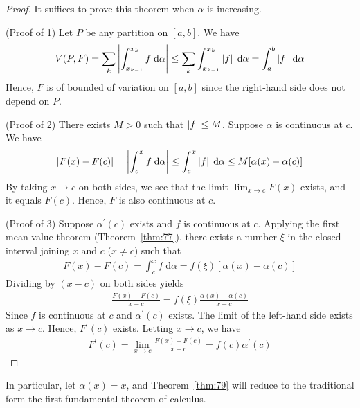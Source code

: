 \documentclass[thmcnt=section, 12pt]{my-elegantbook}
\begin{document}
\begin{proof}
	It suffices to prove this theorem when $\alpha$ is increasing.

	(Proof of 1) Let $P$ be any partition on $[a, b]$.
	We have 
	\begin{align*}
		V(P,F) = \sum_{k} \left\lvert 
			\int_{x_{k-1}}^{x_k} f \; \mathrm{d} \alpha
		 \right\rvert
		\leq \sum_{k}
		\int_{x_{k-1}}^{x_k} \left\lvert f \right\rvert \; \mathrm{d} \alpha
		= \int_{a}^{b} \left\lvert f \right\rvert \; \mathrm{d} \alpha
	\end{align*}
	Hence, $F$ is of bounded of variation on $[a, b]$
	since the right-hand side does not depend on $P$.

	(Proof of 2) There exists $M > 0$ such that $\left\lvert f \right\rvert \leq M$.
	Suppose $\alpha$ is continuous at $c$.
	We have 
	\begin{align*}
		\left\lvert F(x) - F(c) \right\rvert
		= \left\lvert 
			\int_c^x f \; \mathrm{d} \alpha
		 \right\rvert \leq \int_c^x \left\lvert f \right\rvert \; \mathrm{d} \alpha
		\leq M [
			\alpha(x) - \alpha(c)
		]
	\end{align*}
	By taking $x \to c$ on both sides, we see that 
	the limit $\lim_{x \to c} F(x)$ exists, and it equals $F(c)$.
	Hence, $F$ is also continuous at $c$.

	(Proof of 3) Suppose $\alpha^\prime(c)$ exists and $f$ is 
	continuous at $c$. 
	Applying the first mean value theorem (Theorem~\ref{thm:77}),
	there exists a number $\xi$ in the closed interval 
	joining $x$ and $c$ ($x \neq c$) such that
	\begin{align*}
		F(x) - F(c)
		= \int_c^x f \; \mathrm{d} \alpha
		= f(\xi) [ \alpha(x) - \alpha(c) ]
	\end{align*}
	Dividing by $(x - c)$ on both sides yields
	\begin{align*}
		\frac{F(x) - F(c)}{x - c}
		= f(\xi) \frac{\alpha(x) - \alpha(c)}{x - c}
	\end{align*}
	Since $f$ is continuous at $c$ and $\alpha^\prime(c)$ exists.
	The limit of the left-hand side exists as $x \to c$.
	Hence, $F^\prime(c)$ exists.
	Letting $x \to c$, we have 
	\begin{align*}
		F^\prime(c) = \lim_{x \to c} \frac{F(x) - F(c)}{x - c}
		= f(c) \alpha^\prime(c)
	\end{align*}
\end{proof}


In particular, let $\alpha(x) = x$, and Theorem~\ref{thm:79}
will reduce to the traditional form the first fundamental
theorem of calculus.
\end{document}
